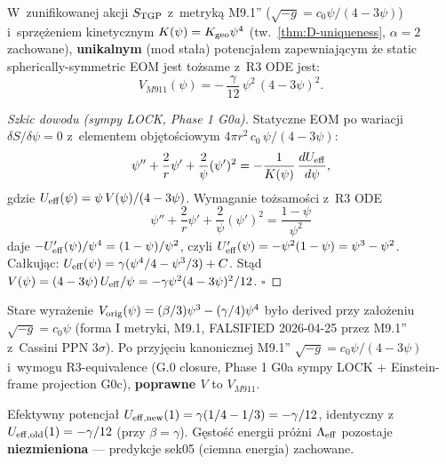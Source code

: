 \begin{proposition}%
\label{prop:V-M911-canonical}
W~zunifikowanej akcji $S_{\rm TGP}$ z~metryk\k{a} M9.1''
($\sqrt{-g} = c_0\psi/(4-3\psi)$) i~sprz\k{e}\.zeniem kinetycznym
$K(\psi) = K_{\rm geo}\psi^4$ (tw.~\ref{thm:D-uniqueness}, $\alpha = 2$
zachowane), \textbf{unikalnym} (mod sta\l{}a) potencja\l{}em zapewniaj\k{a}cym
\.ze static spherically-symmetric EOM jest to\.zsame z~R3 ODE jest:
\begin{equation}\label{eq:V-M911}
  \boxed{
    V_{M911}(\psi) = -\,\frac{\gamma}{12}\,\psi^2\,(4-3\psi)^2.
  }
\end{equation}
\end{proposition}

\begin{proof}[Szkic dowodu (sympy LOCK, Phase 1 G0a)]
Statyczne EOM po wariacji $\delta S/\delta\psi = 0$ z~elementem
obj\k{e}to\'sciowym $4\pi r^2\,c_0\,\psi/(4-3\psi)$:
\begin{equation}
  \psi'' + \frac{2}{r}\psi' + \frac{2}{\psi}(\psi')^2
  = -\frac{1}{K(\psi)}\,\frac{dU_{\rm eff}}{d\psi},
\end{equation}
gdzie $U_{\rm eff}(\psi) = \psi\,V(\psi)/(4-3\psi)$.
Wymaganie to\.zsamo\'sci z~R3 ODE
\begin{equation}\label{eq:R3-ODE}
  \psi'' + \frac{2}{r}\psi' + \frac{2}{\psi}(\psi')^2
  = \frac{1-\psi}{\psi^2}
\end{equation}
daje $-U_{\rm eff}'(\psi)/\psi^4 = (1-\psi)/\psi^2$, czyli
$U_{\rm eff}'(\psi) = -\psi^2(1-\psi) = \psi^3 - \psi^2$.
Ca\l{}kuj\k{a}c: $U_{\rm eff}(\psi) = \gamma(\psi^4/4 - \psi^3/3) + C$.
St\k{a}d $V(\psi) = (4-3\psi)\,U_{\rm eff}/\psi = -\gamma\psi^2(4-3\psi)^2/12$.
$\square$
\end{proof}

\begin{remark}%
\label{rem:V-M911-backwards-compat}
Stare wyra\.zenie $V_{\rm orig}(\psi) = (\beta/3)\psi^3 - (\gamma/4)\psi^4$
by\l{}o derived przy za\l{}o\.zeniu $\sqrt{-g} = c_0\psi$ (forma I metryki,
M9.1, FALSIFIED 2026-04-25 przez M9.1'' z~Cassini PPN $3\sigma$).
Po przyj\k{e}ciu kanonicznej M9.1'' $\sqrt{-g} = c_0\psi/(4-3\psi)$
i~wymogu R3-equivalence (G.0 closure, Phase 1 G0a sympy LOCK +
Einstein-frame projection G0c), \textbf{poprawne $V$} to $V_{M911}$.

Efektywny potencja\l{} $U_{\rm eff,new}(1) = \gamma(1/4 - 1/3) = -\gamma/12$,
identyczny z~$U_{\rm eff,old}(1) = -\gamma/12$ (przy $\beta = \gamma$).
G\k{e}sto\'s\'c energii pr\'o\.zni $\Lambda_{\rm eff}$ pozostaje
\textbf{niezmieniona} --- predykcje sek05 (ciemna energia) zachowane.
\end{remark}

